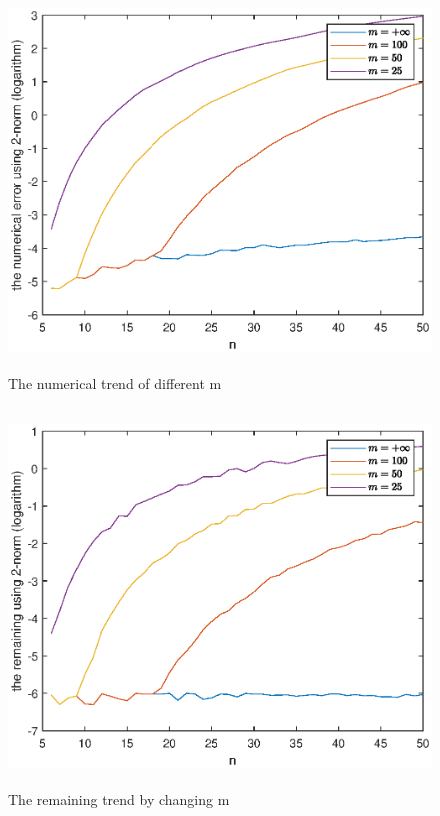 \documentclass[UTF8,a4paper,10pt]{ctexart}
\begin{document}
\begin{figure}[ht]
    \centering
    \includegraphics[width=14cm,height=10cm]{2.5_error.eps}
    \caption{The numerical trend of different m}
\end{figure}
\begin{figure}[ht]
    \centering
    \includegraphics[width=14cm,height=10cm]{2.5_remaining.eps}
    \caption{The remaining trend by changing m}
\end{figure}
\end{document}
